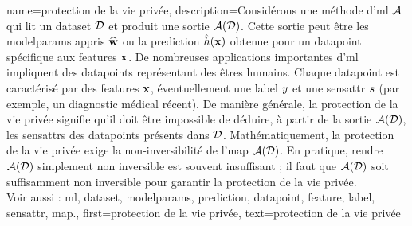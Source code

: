 {name={protection de la vie privée},
	description={Considérons une méthode d’\gls{ml} $\mathcal{A}$ qui lit un \gls{dataset} $\mathcal{D}$ et produit une sortie $\mathcal{A}(\mathcal{D})$. Cette sortie peut être les \gls{modelparams} appris $\widehat{{\bf w}}$ ou la \gls{prediction} $\hat{h}({\bf x})$ obtenue pour un \gls{datapoint} spécifique aux \glspl{feature} ${\bf x}$. 
		De nombreuses applications importantes d'\gls{ml} impliquent des \glspl{datapoint} représentant des êtres humains. Chaque \gls{datapoint} est caractérisé par des \glspl{feature} ${\bf x}$, éventuellement une \gls{label} $y$ et une \gls{sensattr} $s$ (par exemple, un diagnostic médical récent). 
		De manière générale, la protection de la vie privée signifie qu’il doit être impossible de déduire, à partir de la sortie $\mathcal{A}(\mathcal{D})$, les \glspl{sensattr} des \glspl{datapoint} présents dans $\mathcal{D}$. 
		Mathématiquement, la protection de la vie privée exige la non-inversibilité de l'\gls{map} $\mathcal{A}(\mathcal{D})$. En pratique, rendre $\mathcal{A}(\mathcal{D})$ simplement non inversible est souvent insuffisant ; il faut que $\mathcal{A}(\mathcal{D})$ soit suffisamment non inversible pour garantir la protection de la vie privée.
		\\
		Voir aussi : \gls{ml}, \gls{dataset}, \gls{modelparams}, \gls{prediction}, \gls{datapoint}, \gls{feature}, \gls{label}, \gls{sensattr}, \gls{map}.},
	first={protection de la vie privée},
	text={protection de la vie privée}
}


